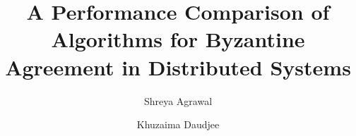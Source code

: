 \title{A Performance Comparison of Algorithms for Byzantine Agreement in
Distributed Systems}


%

\author[uw]{Shreya Agrawal}
\author[uw]{Khuzaima Daudjee}

\address[uw]{University of Waterloo, 200 University Ave W, Waterloo, Canada, N2L 3G1}



